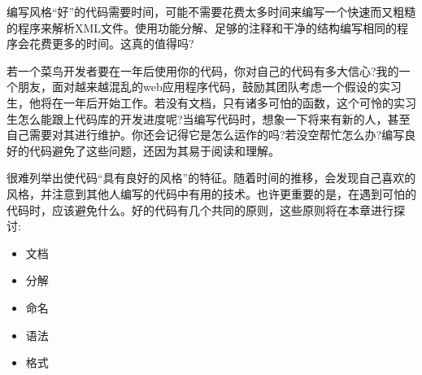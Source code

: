 
编写风格“好”的代码需要时间，可能不需要花费太多时间来编写一个快速而又粗糙的程序来解析XML文件。使用功能分解、足够的注释和干净的结构编写相同的程序会花费更多的时间。这真的值得吗?


若一个菜鸟开发者要在一年后使用你的代码，你对自己的代码有多大信心?我的一个朋友，面对越来越混乱的web应用程序代码，鼓励其团队考虑一个假设的实习生，他将在一年后开始工作。若没有文档，只有诸多可怕的函数，这个可怜的实习生怎么能跟上代码库的开发进度呢?当编写代码时，想象一下将来有新的人，甚至自己需要对其进行维护。你还会记得它是怎么运作的吗?若没空帮忙怎么办?编写良好的代码避免了这些问题，还因为其易于阅读和理解。


很难列举出使代码“具有良好的风格”的特征。随着时间的推移，会发现自己喜欢的风格，并注意到其他人编写的代码中有用的技术。也许更重要的是，在遇到可怕的代码时，应该避免什么。好的代码有几个共同的原则，这些原则将在本章进行探讨:

\begin{itemize}
\item
文档

\item
分解

\item
命名

\item
语法

\item
格式
\end{itemize}





